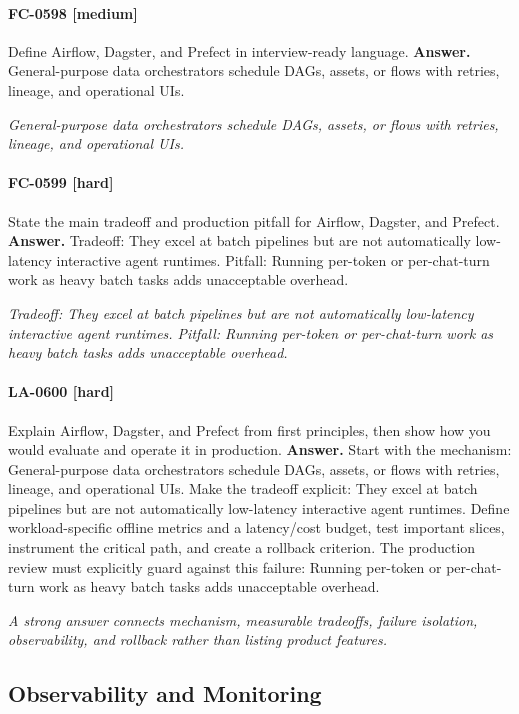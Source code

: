 \paragraph{FC-0598 [medium]} Define Airflow, Dagster, and Prefect in interview-ready language.
\noindent\textbf{Answer.} General-purpose data orchestrators schedule DAGs, assets, or flows with retries, lineage, and operational UIs.
\par\textit{General-purpose data orchestrators schedule DAGs, assets, or flows with retries, lineage, and operational UIs.}
\paragraph{FC-0599 [hard]} State the main tradeoff and production pitfall for Airflow, Dagster, and Prefect.
\noindent\textbf{Answer.} Tradeoff: They excel at batch pipelines but are not automatically low-latency interactive agent runtimes. Pitfall: Running per-token or per-chat-turn work as heavy batch tasks adds unacceptable overhead.
\par\textit{Tradeoff: They excel at batch pipelines but are not automatically low-latency interactive agent runtimes. Pitfall: Running per-token or per-chat-turn work as heavy batch tasks adds unacceptable overhead.}
\paragraph{LA-0600 [hard]} Explain Airflow, Dagster, and Prefect from first principles, then show how you would evaluate and operate it in production.
\noindent\textbf{Answer.} Start with the mechanism: General-purpose data orchestrators schedule DAGs, assets, or flows with retries, lineage, and operational UIs. Make the tradeoff explicit: They excel at batch pipelines but are not automatically low-latency interactive agent runtimes. Define workload-specific offline metrics and a latency/cost budget, test important slices, instrument the critical path, and create a rollback criterion. The production review must explicitly guard against this failure: Running per-token or per-chat-turn work as heavy batch tasks adds unacceptable overhead.
\par\textit{A strong answer connects mechanism, measurable tradeoffs, failure isolation, observability, and rollback rather than listing product features.}
\subsection{Observability and Monitoring}
